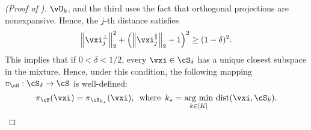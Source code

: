 \documentclass[../../book-main.tex]{subfiles}
\begin{document}
\begin{proof}[(Proof of )]
    $\vU_k$, and the third uses the fact that orthogonal projections are
    nonexpansive.
    Hence, the $j$-th distance satisfies
    \begin{equation}
        \norm*{\vxi^{\perp}_j}_2^2
        + \left( \norm*{\vxi^{\|}_j}_2 - 1 \right)^2
        \geq
        (1 - \delta)^2.
    \end{equation}
    This implies that if $0 < \delta < 1/2$, every $\vxi \in \cS_{\delta}$ has
    a unique closest subspace in the mixture.
    Hence, under this condition, the following mapping $\pi_{\cS} : \cS_{\delta}
    \to \cS$ is well-defined:
    \begin{equation}
        \pi_{\cS}(\vxi) 
        =
        \pi_{\cS_{k_\star}}(\vxi),
        \enspace\text{where}\enspace
        k_{\star} = \argmin_{k \in [K]}\,
        \dist(\vxi, \cS_{k}).
    \end{equation}



\end{proof}
\end{document}
